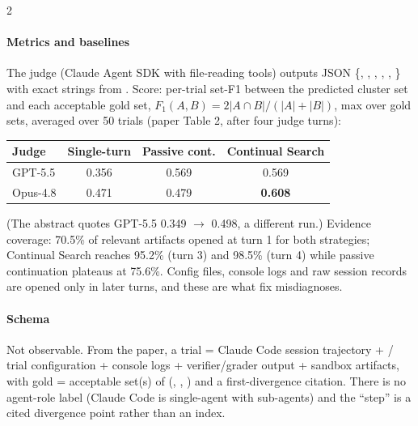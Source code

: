 \begin{multicols}{2}
\paragraph{Metrics and baselines} The judge (Claude Agent SDK with file-reading tools) outputs JSON \{, , , , , \} with exact strings from . Score: per-trial set-F1 between the predicted cluster set and each acceptable gold set, $F_1(A,B)=2|A\cap B|/(|A|+|B|)$, max over gold sets, averaged over 50 trials (paper Table 2, after four judge turns):

\begin{center}\small
\begin{tabular}{@{}lccc@{}}\toprule
Judge & Single-turn & Passive cont. & Continual Search\\\midrule
GPT-5.5 & 0.356 & 0.569 & 0.569\\
Opus-4.8 & 0.471 & 0.479 & \textbf{0.608}\\\bottomrule
\end{tabular}
\end{center}
(The abstract quotes GPT-5.5 0.349 $\to$ 0.498, a different run.) Evidence coverage: 70.5\% of relevant artifacts opened at turn 1 for both strategies; Continual Search reaches 95.2\% (turn 3) and 98.5\% (turn 4) while passive continuation plateaus at 75.6\%. Config files, console logs and raw session records are opened only in later turns, and these are what fix misdiagnoses.

\paragraph{Schema} Not observable. From the paper, a trial = Claude Code session trajectory +  / trial configuration + console logs + verifier/grader output + sandbox artifacts, with gold = acceptable set(s) of (, , ) and a first-divergence citation. There is no agent-role label (Claude Code is single-agent with sub-agents) and the ``step'' is a cited divergence point rather than an index.
\end{multicols}

